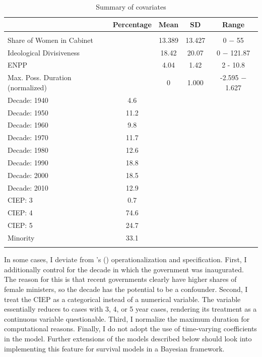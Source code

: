 \documentclass[11pt]{article}
\newcommand\possecite[1]{\citeauthor{#1}'s (\citeyear{#1})}
\begin{document}
\begin{table}[!htbp] \centering 
  \caption{Summary of covariates} 
  \label{tab:summarystat} 
\begin{tabular}{@{\extracolsep{5pt}}lcccc} 
& \multicolumn{1}{c}{\textbf{Percentage}} & \multicolumn{1}{c}{\textbf{Mean}} & \multicolumn{1}{c}{\textbf{SD}} & \multicolumn{1}{c}{\textbf{Range}}
\\\hline 
\hline \\[-1.8ex]  
Share of Women in Cabinet & & 13.389 & 13.427 & 0 $-$ 55\\ 
Ideological Divisiveness & & 18.42 & 20.07 & 0 $-$ 121.87  \\ 
ENPP & & 4.04 & 1.42 & 2 - 10.8\\ 
Max. Poss. Duration (normalized) & & 0 & 1.000 & -2.595 $-$ 1.627 \\\hline 
Decade: 1940 & 4.6 & & & \\ 
Decade: 1950 & 11.2  & & & \\ 
Decade: 1960 & 9.8 & & &   \\ 
Decade: 1970 & 11.7 & & &   \\ 
Decade: 1980 & 12.6 & & &   \\ 
Decade: 1990 & 18.8 & & &   \\ 
Decade: 2000 & 18.5 & & &   \\ 
Decade: 2010 & 12.9 & & &   \\ 
CIEP: 3      & 0.7 & & & \\ 
CIEP: 4      & 74.6 & & & \\ 
CIEP: 5      & 24.7 & & &  \\ 
Minority     & 33.1 & & & \\ 
\hline \\[-1.8ex] 
\end{tabular}  
\end{table} 

In some cases, I deviate from \possecite{KK20} operationalization and specification. First, I additionally control for the decade in which the government was inaugurated. The reason for this is that recent governments clearly have higher shares of female ministers, so the decade has the potential to be a confounder. Second, I treat the CIEP as a categorical instead of a numerical variable. The variable essentially reduces to cases with 3, 4, or 5 year cases, rendering its treatment as a continuous variable questionable. Third, I normalize the maximum duration for computational reasons. Finally, I do not adopt the use of time-varying coefficients in the model. Further extensions of the models described below should look into implementing this feature for survival models in a Bayesian framework. 
\end{document}

